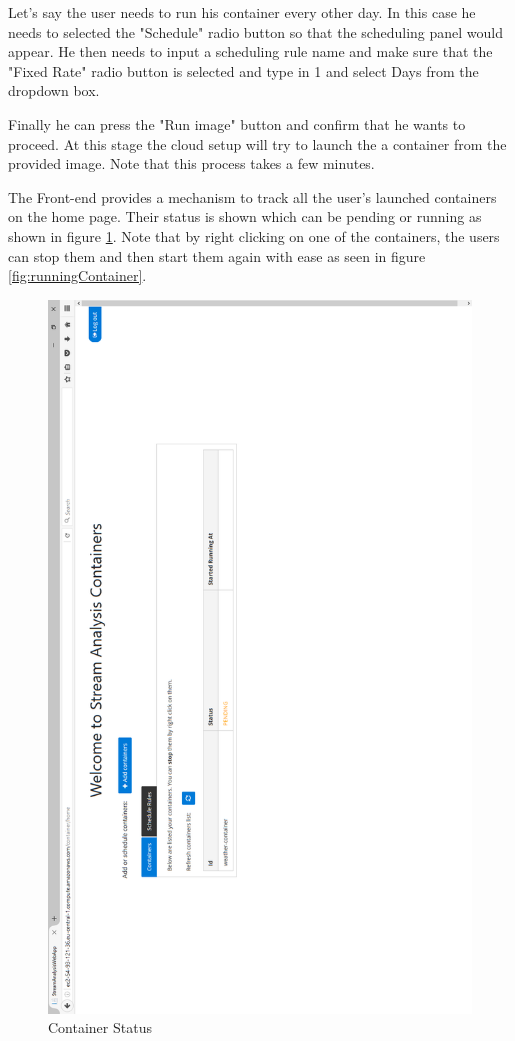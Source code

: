 Let's say the user needs to run his container every other day. In this case he needs to selected the "Schedule" radio button so that the scheduling panel would appear. He then needs to input a scheduling rule name and make sure that the "Fixed Rate" radio button is selected and type in 1 and select Days from the dropdown box.

Finally he can press the "Run image" button and confirm that he wants to proceed. At this stage the cloud setup will try to launch the a container from the provided image. Note that this process takes a few minutes.

The Front-end provides a mechanism to track all the user's launched containers on the home page. Their status is shown which can be pending or running as shown in figure \ref{fig:containersExample}. Note that by right clicking on one of the containers, the users can stop them and then start them again with ease as seen in figure \ref{fig:runningContainer}.\\

\begin{figure}[p]
	\centering
	\noindent
	\includegraphics[width=0.5\paperwidth]{./images/guide/container/containersExample.PNG}
	\caption{Container Status}
	\label{fig:containersExample}
\end{figure}

